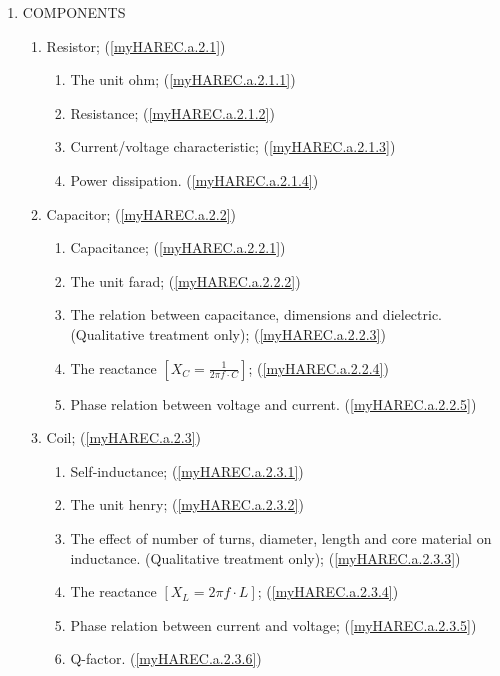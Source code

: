\begin{enumerate}
\item COMPONENTS
\begin{enumerate}[noitemsep]
\item Resistor; (\ref{myHAREC.a.2.1})\label{HAREC.a.2.1}
\begin{enumerate}[noitemsep]
\item The unit ohm; (\ref{myHAREC.a.2.1.1})\label{HAREC.a.2.1.1}
\item Resistance; (\ref{myHAREC.a.2.1.2})\label{HAREC.a.2.1.2}
\item Current/voltage characteristic; (\ref{myHAREC.a.2.1.3})\label{HAREC.a.2.1.3}
\item Power dissipation. (\ref{myHAREC.a.2.1.4})\label{HAREC.a.2.1.4}
\end{enumerate}
\item Capacitor; (\ref{myHAREC.a.2.2})\label{HAREC.a.2.2}
\begin{enumerate}[noitemsep]
\item Capacitance; (\ref{myHAREC.a.2.2.1})\label{HAREC.a.2.2.1}
\item The unit farad; (\ref{myHAREC.a.2.2.2})\label{HAREC.a.2.2.2}
\item The relation between capacitance, dimensions and dielectric. (Qualitative treatment only); (\ref{myHAREC.a.2.2.3})\label{HAREC.a.2.2.3}
\item The reactance $\left[X_C = \frac{1}{2\pi f \cdot C}\right]$; (\ref{myHAREC.a.2.2.4})\label{HAREC.a.2.2.4}
\item Phase relation between voltage and current. (\ref{myHAREC.a.2.2.5})\label{HAREC.a.2.2.5}
\end{enumerate}
\item Coil; (\ref{myHAREC.a.2.3})\label{HAREC.a.2.3}
\begin{enumerate}[noitemsep]
\item Self‑inductance; (\ref{myHAREC.a.2.3.1})\label{HAREC.a.2.3.1}
\item The unit henry; (\ref{myHAREC.a.2.3.2})\label{HAREC.a.2.3.2}
\item The effect of number of turns, diameter, length and core material on inductance. (Qualitative treatment only); (\ref{myHAREC.a.2.3.3})\label{HAREC.a.2.3.3}
\item The reactance  $\left[X_L = 2\pi f \cdot L\right]$; (\ref{myHAREC.a.2.3.4})\label{HAREC.a.2.3.4}
\item Phase relation between current and voltage; (\ref{myHAREC.a.2.3.5})\label{HAREC.a.2.3.5}
\item Q-factor. (\ref{myHAREC.a.2.3.6})\label{HAREC.a.2.3.6}

\end{enumerate}
\end{enumerate}
\end{enumerate}
